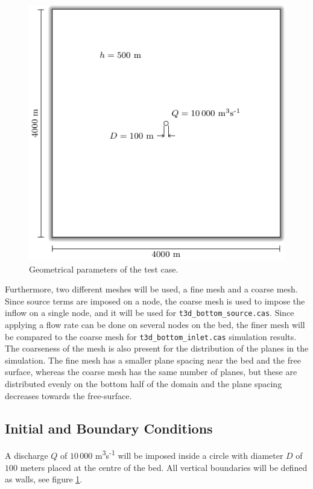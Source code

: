 \begin{figure}[t!]
\begin{center}
	\includegraphics[]{GeomPlan.pdf}
\end{center}
\caption{Geometrical parameters of the test case.}
\label{fig:GeomPlan}
\end{figure}

Furthermore, two different meshes will be used, a fine mesh and a coarse mesh.
Since source terms are imposed on a node, the coarse mesh is used to impose the
inflow on a single node, and it will be used for
\texttt{t3d\_bottom\_source.cas}. Since applying a flow rate can be done on
several nodes on the bed, the finer mesh will be compared to the coarse mesh
for \texttt{t3d\_bottom\_inlet.cas} simulation results. The coarseness of the
mesh is also present for the distribution of the planes in the simulation. The
fine mesh has a smaller plane spacing near the bed and the free surface,
whereas the coarse mesh has the same number of planes, but these are
distributed evenly on the bottom half of the domain and the plane spacing
decreases towards the free-surface.

%
%
\subsection{Initial and Boundary Conditions}
%
A discharge $Q$ of $10\,000$ m\textsuperscript{3}s\textsuperscript{-1} will be
imposed inside a circle with diameter $D$ of $100$ meters placed at the centre
of the bed. All vertical boundaries will be defined as walls, see figure
\ref{fig:GeomPlan}.


